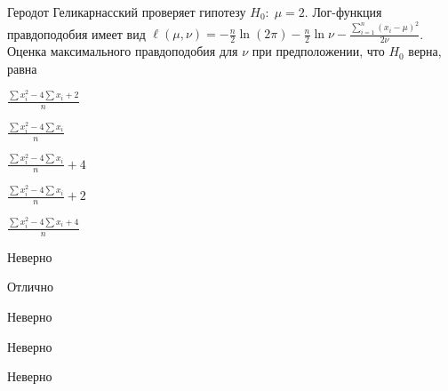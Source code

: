 
\begin{question}
Геродот Геликарнасский проверяет гипотезу \(H_0: \; \mu=2\). Лог-функция
правдоподобия имеет вид
\(\ell(\mu,\nu)=-\frac{n}{2}\ln (2\pi)-\frac{n}{2}\ln \nu -\frac{\sum_{i=1}^n(x_i-\mu)^2}{2\nu}\).
Оценка максимального правдоподобия для \(\nu\) при предположении, что
\(H_0\) верна, равна
\begin{answerlist}
  \item \(\frac{\sum x_i^2 - 4\sum x_i+2}{n}\)
  \item \(\frac{\sum x_i^2 - 4\sum x_i}{n}\)
  \item \(\frac{\sum x_i^2 - 4\sum x_i}{n}+4\)
  \item \(\frac{\sum x_i^2 - 4\sum x_i}{n}+2\)
  \item \(\frac{\sum x_i^2 - 4\sum x_i+4}{n}\)
\end{answerlist}
\end{question}

\begin{solution}
\begin{answerlist}
  \item Неверно
  \item Отлично
  \item Неверно
  \item Неверно
  \item Неверно
\end{answerlist}
\end{solution}

